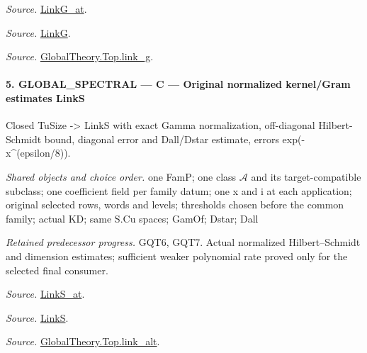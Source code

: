 \emph{Source.} \href{https://github.com/CocoSgt/riemann-hypothesis-lean/blob/7cbf7a0c32fca1badf05931879a37c3f8a2b03b4/src/Formalism/SharpRestriction/GlobalTheoremInputs.lean#L122-L137}{LinkG\_\allowbreak at}.

\emph{Source.} \href{https://github.com/CocoSgt/riemann-hypothesis-lean/blob/7cbf7a0c32fca1badf05931879a37c3f8a2b03b4/src/Formalism/SharpRestriction/GlobalTheoremInputs.lean#L138-L141}{LinkG}.

\emph{Source.} \href{https://github.com/CocoSgt/riemann-hypothesis-lean/blob/7cbf7a0c32fca1badf05931879a37c3f8a2b03b4/src/Development/AbelianVarietyTheory/Proofs/GlobalInterpolation/LinkG.lean#L14-L27}{GlobalTheory.Top.link\_\allowbreak g}.



\paragraph{5. GLOBAL\_\allowbreak SPECTRAL — C — Original normalized kernel/Gram estimates LinkS}

Closed TuSize -> LinkS with exact Gamma normalization, off-diagonal Hilbert-Schmidt bound, diagonal error and Dall/Dstar estimate, errors exp(-x\textasciicircum{}(epsilon/8)).

\emph{Shared objects and choice order.} one FamP; one class $\mathcal A$ and its target-compatible subclass; one coefficient field per family datum; one x and i at each application; original selected rows, words and levels; thresholds chosen before the common family; actual KD; same S.Cu spaces; GamOf; Dstar; Dall

\emph{Retained predecessor progress.} GQT6, GQT7. Actual normalized Hilbert–Schmidt and dimension estimates; sufficient weaker polynomial rate proved only for the selected final consumer.

\emph{Source.} \href{https://github.com/CocoSgt/riemann-hypothesis-lean/blob/7cbf7a0c32fca1badf05931879a37c3f8a2b03b4/src/Formalism/SharpRestriction/GlobalTheoremInputs.lean#L145-L149}{LinkS\_\allowbreak at}.

\emph{Source.} \href{https://github.com/CocoSgt/riemann-hypothesis-lean/blob/7cbf7a0c32fca1badf05931879a37c3f8a2b03b4/src/Formalism/SharpRestriction/GlobalTheoremInputs.lean#L152-L157}{LinkS}.

\emph{Source.} \href{https://github.com/CocoSgt/riemann-hypothesis-lean/blob/7cbf7a0c32fca1badf05931879a37c3f8a2b03b4/src/Development/AbelianVarietyTheory/Proofs/GlobalInterpolation/LinkAlt.lean#L16-L50}{GlobalTheory.Top.link\_\allowbreak alt}.



